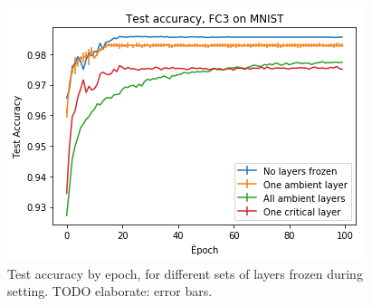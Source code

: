 \documentclass{article}
\begin{document}
\begin{figure}
  \includegraphics[width=\linewidth]{images/fc3_mnist_training_plots.png}
  \caption{Test accuracy by epoch, for different sets of layers frozen during setting. TODO elaborate: error bars.}
  \label{fig:fc3_training}
\end{figure}
\end{document}
